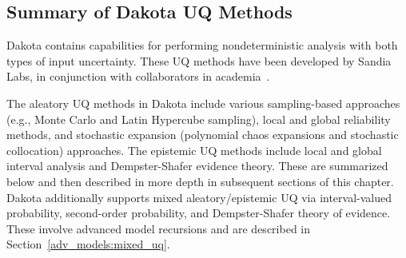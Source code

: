 \subsection{Summary of Dakota UQ Methods}\label{uq:overview:methods}

Dakota contains capabilities for performing nondeterministic analysis
with both types of input uncertainty. These UQ methods have been
developed by Sandia Labs, in conjunction with collaborators in
academia~\cite{Gha99,Gha91,Eld05,Tang10a}.

The aleatory UQ methods in Dakota include various sampling-based
approaches (e.g., Monte Carlo and Latin Hypercube sampling), local and
global reliability methods, and stochastic expansion (polynomial chaos
expansions and stochastic collocation) approaches. The epistemic UQ
methods include local and global interval analysis and Dempster-Shafer
evidence theory. These are summarized below and then described in more
depth in subsequent sections of this chapter. Dakota additionally
supports mixed aleatory/epistemic UQ via interval-valued probability,
second-order probability, and Dempster-Shafer theory of
evidence. These involve advanced model recursions and are described in
Section~\ref{adv_models:mixed_uq}.



